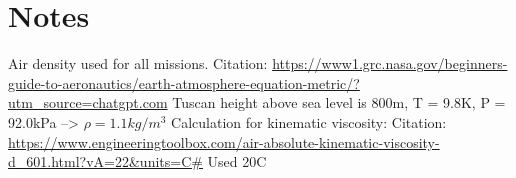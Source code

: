 \documentclass[10pt]{article}
\makeatletter
\newcommand{\code}[1]{\texttt{\detokenize{#1}}}
\newcounter{tnote}
\gdef\tnote@list{}
\newcommand{\notetext}[2]{\expandafter\gdef\csname tnote@txt@#1\endcsname{#2}}
\newcommand{\printnotes}{%
  \begingroup\small
  \def\tnote@item##1{\par\noindent\hangindent=1.5em
    \textsuperscript{\csname tnote@num@##1\endcsname}\ \code{##1}: %
    \@ifundefined{tnote@txt@##1}{\textbf{[TODO: add note]}}{\csname tnote@txt@##1\endcsname}}%
  \tnote@list\par
  \endgroup}
\makeatother
\begin{document}
\section*{Notes}

\notetext{rho}{Air density used for all missions. 
Citation: \url{https://www1.grc.nasa.gov/beginners-guide-to-aeronautics/earth-atmosphere-equation-metric/?utm_source=chatgpt.com}
Tuscan height above sea level is 800m, T = 9.8K, P = 92.0kPa --> $\rho = 1.1 kg/m^3$
}
\notetext{nu}{Calculation for kinematic viscosity:
Citation: \url{https://www.engineeringtoolbox.com/air-absolute-kinematic-viscosity-d_601.html?vA=22&units=C\#}
Used 20C
}

\printnotes
\end{document}
